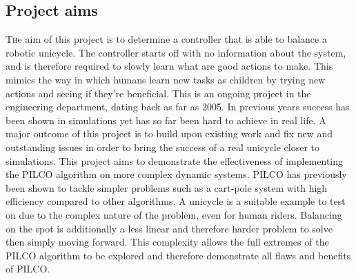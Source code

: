 \documentclass[twoside,twocolumn,12pt]{article}
\begin{document}
\subsection{Project aims}
\lettrine[nindent=0em,lines=3]{T}he aim of this project is to determine a controller that is able to balance a robotic unicycle. The controller starts off with no information about the system, and is therefore required to slowly learn what are good actions to make. This mimics the way in which humans learn new tasks as children by trying new actions and seeing if they're beneficial.
\newline
This is an ongoing project in the engineering department, dating back as far as 2005. In previous years success has been shown in simulations yet has so far been hard to achieve in real life. A major outcome of this project is to build upon existing  work and fix new and outstanding issues in order to bring the success of a real unicycle closer to simulations. 
\newline
This project aims to demonstrate the effectiveness of implementing the PILCO algorithm \cite{pilco} on more complex dynamic systems. PILCO has previously been shown to tackle simpler problems such as a cart-pole system with high efficiency compared to other algorithms. 
\newline 
A unicycle is a suitable example to test on due to the complex nature of the problem, even for human riders. Balancing on the spot is additionally a less linear and therefore harder problem to solve then simply moving forward. This complexity allows the full extremes of the PILCO algorithm to be explored and therefore demonstrate all flaws and benefits of PILCO.
\end{document}
